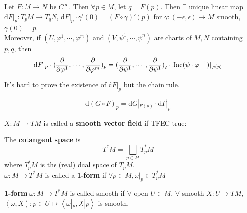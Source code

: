\begin{theorem}
    Let  $ F:M\rightarrow N  $ be  $ C^\infty $. Then  $ \forall p\in M  $, let  $ q=F(p) $. Then  $ \exists  $ unique linear map  $ \mathrm{d}F|_p:T_pM\rightarrow T_q N $,  $ \mathrm{d}F|_p\cdot \gamma'(0)=(F\circ  \gamma)'(p) $   for  $ \gamma:(-\epsilon,\epsilon)\rightarrow M $ smooth,  $ \gamma(0)=p $.\\
    Moreover, if  $ (U,\varphi^1,\cdots,\varphi^m) $ and  $ (V,\psi^1,\cdots,\psi^n) $ are charts of  $ M,N $ containing  $ p,q $, then 
    \[\mathrm{d}F|_p\cdot(\frac{\partial}{\partial\varphi^1},\cdots,\frac{\partial}{\partial\varphi^m})
    _p=(\frac{\partial}{\partial\psi^1},\cdots,\frac{\partial}{\partial\psi^1})_q\cdot \operatorname{Jac}(\psi\cdot\varphi^{-1})|_{\varphi(p)}\]      
\end{theorem}
\begin{remark}
    It's hard to prove the existence of  $ \mathrm{d}F|_p $ but the chain rule.
\end{remark}
\begin{proposition}
    \[\mathrm{d}(G\circ F)_p=\mathrm{d}G|_{F(p)}\cdot \mathrm{d}F|_p\]
\end{proposition}
\begin{definition}
     $ X :M\rightarrow TM $ is called a \textbf{smooth vector field} if TFEC true:
\end{definition}
\begin{definition}
    The \textbf{cotangent space} is 
    \[T^*M=\bigsqcup\limits_{p\in M}T_p^*M\]
    where  $ T_p^*M  $ is the (real) dual space of  $ T_pM $.\\
     $ \omega :M\rightarrow T^*M $ is called a \textbf{1-form} if  $ \forall p\in M, \omega|_p\in T_p^*M $   
\end{definition}
\begin{definition}
    \textbf{1-form} $ \omega :M\rightarrow T^*M $ is called smooth if  $ \forall  $ open  $ U\subset M $,  $ \forall  $ smooth  $ X:U\rightarrow TM $,  $  \left< \omega,X \right>:p\in U\mapsto  \left< \omega|_p,X|p \right>   $ is smooth. 
\end{definition}
